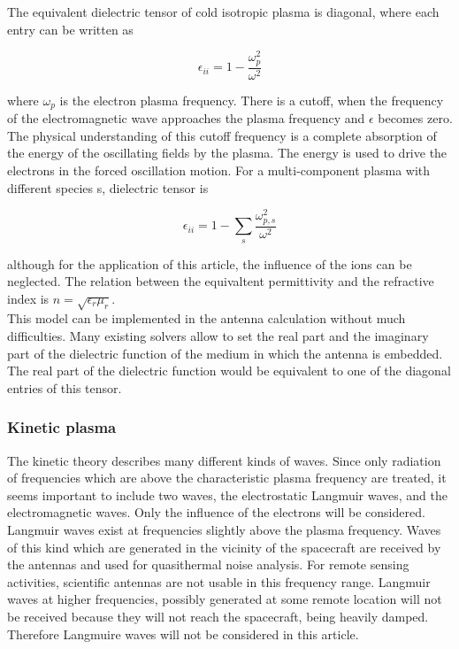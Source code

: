\documentclass[two-column,ras]{agutex}
\begin{document}
\begin{article}
The equivalent dielectric tensor of cold isotropic plasma is diagonal, where each entry can be written as


\begin{equation}\label{epsilon_plasma}
   \epsilon_{ii}=1-\frac{\omega_p^2 }{ \omega^2 }
\end{equation}

where $\omega_p$ is the electron plasma frequency. There is a cutoff, when the frequency of the electromagnetic wave approaches the plasma frequency and $\epsilon$ becomes zero. The physical understanding of this cutoff frequency is a complete absorption of the energy of the oscillating fields by the plasma. The energy is used to drive the electrons in the forced oscillation motion. For a multi-component plasma with different species s, dielectric tensor is

\begin{equation}
    \epsilon_{ii}=1-\sum_s \frac{\omega_{p,s}^2 }{ \omega^2 } 
\end{equation}

although for the application of this article, the influence of the ions can be neglected. The relation between the equivaltent permittivity and the refractive index is $n=\sqrt{\epsilon_r\mu_r}$.\\ 

This model can be implemented in the antenna calculation without much difficulties. Many existing solvers allow to set the real part and the imaginary part of the dielectric function of the medium in which the antenna is embedded. The real part of the dielectric function would be equivalent to one of the diagonal entries of this tensor.\\

\subsubsection{Kinetic plasma}\label{sec_isotropic_kinetic_permittivity}
The kinetic theory describes many different kinds of waves. Since only radiation of frequencies which are above the characteristic plasma frequency are treated, it seems important to include two waves, the electrostatic Langmuir waves, and the electromagnetic waves. Only the influence of
the electrons will be considered.\\

Langmuir waves exist at frequencies slightly above the plasma frequency. Waves of this kind which are generated in the vicinity of the spacecraft are received by the antennas and used for quasithermal noise analysis. For remote sensing activities, scientific antennas are not usable in this frequency range. Langmuir waves at higher frequencies, possibly generated at some remote location will not be received because they will not reach the spacecraft, being heavily damped. Therefore Langmuire waves will not be considered in this article.\\


\end{article}
\end{document}
